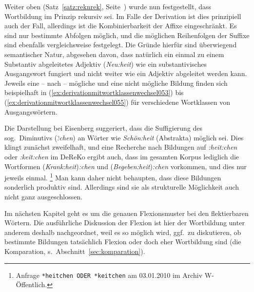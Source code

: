 Weiter oben (Satz~\ref{satz:reknrek}, Seite~\pageref{satz:reknrek}) wurde nun festgestellt, dass Wortbildung im Prinzip rekursiv sei.
Im Falle der Derivation ist dies prinzipiell auch der Fall, allerdings ist die Kombinierbarkeit der Affixe eingeschränkt.
Es sind nur bestimmte Abfolgen möglich, und die möglichen Reihenfolgen der Suffixe sind ebenfalls vergleichsweise festgelegt.
Die Gründe hierfür sind überwiegend semantischer Natur, abgesehen davon, dass natürlich \zB ein einmal zu einem Substantiv abgeleitetes Adjektiv (\textit{Neu:heit}) wie ein substantivisches Ausgangswort fungiert und nicht weiter wie ein Adjektiv abgeleitet werden kann.
Jeweils eine -- nach \citealp{Eisenberg2013a} -- mögliche und eine nicht mögliche Bildung finden sich beispielhaft in (\ref{ex:derivationmitwortklassenwechsel053}) bis (\ref{ex:derivationmitwortklassenwechsel055}) für verschiedene Wortklassen von Ausgangswörtern.

\begin{exe}
\end{exe}


Die Darstellung bei Eisenberg suggeriert, dass die Suffigierung des sog.\ Diminutivs (\textit{\~:chen}) an Wörter wie \textit{Schön:heit} (Abstrakta) möglich sei.
Dies klingt zunächst zweifelhaft, und eine Recherche nach Bildungen auf \textit{:heit:chen} oder \textit{:keit:chen} im DeReKo ergibt auch, dass im gesamten Korpus lediglich die Wortformen (\textit{Krank:heit})\textit{:chen} und (\textit{Begeben:heit})\textit{:chen} vorkommen, und dies nur jeweils einmal.%
\footnote{Anfrage \texttt{*heitchen ODER *keitchen} am 03.01.2010 im Archiv W-Öffentlich.}
Man kann daher nicht behaupten, dass diese Bildungen sonderlich produktiv sind.
Allerdings sind sie als strukturelle Möglichkeit auch nicht ganz ausgeschlossen.

Im nächsten Kapitel geht es um die genauen Flexionsmuster bei den flektierbaren Wörtern.
Die ausführliche Diskussion der Flexion ist hier der Wortbildung unter anderem deshalb nachgeordnet, weil es so möglich wird, ggf.\ zu diskutieren, ob bestimmte Bildungen tatsächlich Flexion oder doch eher Wortbildung sind (\zB die Komparation, s.\ Abschnitt~\ref{sec:komparation}).

